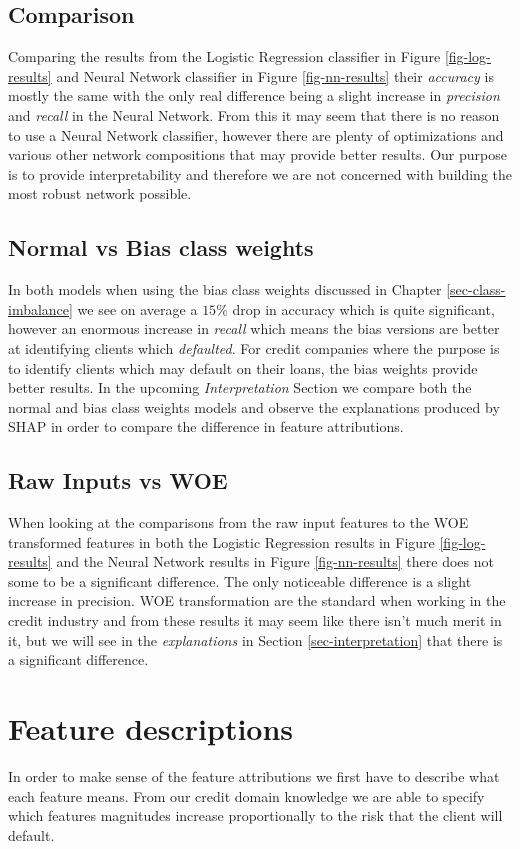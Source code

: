 \subsection{Comparison}
Comparing the results from the Logistic Regression classifier in Figure \ref{fig-log-results} and Neural Network classifier in Figure \ref{fig-nn-results} their \emph{accuracy} is mostly the same with the only real difference being a slight increase in \emph{precision} and \emph{recall} in the Neural Network. From this it may seem that there is no reason to use a Neural Network classifier, however there are plenty of optimizations and various other network compositions that may provide better results. Our purpose is to provide interpretability and therefore we are not concerned with building the most robust network possible.
\subsection{Normal vs Bias class weights}
In both models when using the bias class weights discussed in Chapter \ref{sec-class-imbalance} we see on average a $15\%$ drop in accuracy which is quite significant, however an enormous increase in \emph{recall} which means the bias versions are better at identifying clients which \emph{defaulted}. For credit companies where the purpose is to identify clients which may default on their loans, the bias weights provide better results. In the upcoming \emph{Interpretation} Section we compare both the normal and bias class weights models and observe the explanations produced by SHAP in order to compare the difference in feature attributions. 
\subsection{Raw Inputs vs WOE}
When looking at the comparisons from the raw input features to the WOE transformed features in both the Logistic Regression results in Figure \ref{fig-log-results} and the Neural Network results in Figure \ref{fig-nn-results} there does not some to be a significant difference. The only noticeable difference is a slight increase in precision. WOE transformation are the standard when working in the credit industry and from these results it may seem like there isn't much merit in it, but we will see in the \emph{explanations} in Section \ref{sec-interpretation} that there is a significant difference.
 \section{Feature descriptions} \label{sect-Feature-Descriptions}
 In order to make sense of the feature attributions we first have to describe what each feature means. From our credit domain knowledge we are able to specify which features magnitudes increase proportionally to the risk that the client will default.
 
